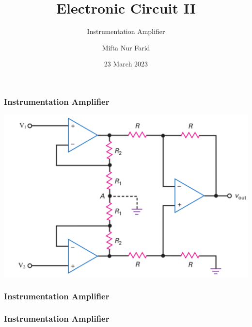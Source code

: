 \documentclass[pdflatex,compress]{beamer}
\title{Electronic Circuit II}
\subtitle{Instrumentation Amplifier}
\author{Mifta Nur Farid}
\date{23 March 2023}
\begin{document}
\maketitle

\begin{frame}
	\frametitle{Instrumentation Amplifier}
	\begin{center}
		\includegraphics[width=0.9\linewidth]{img/Figure-18-18}
	\end{center}
\end{frame}

\begin{frame}
	\frametitle{Instrumentation Amplifier}

\end{frame}

\begin{frame}
	\frametitle{Instrumentation Amplifier}

\end{frame}
\end{document}
